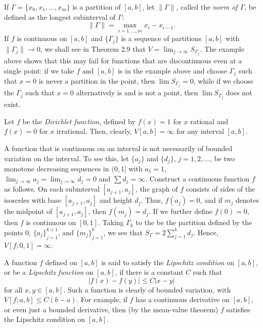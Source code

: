 If $\Gamma=\{x_0,x_1,\dotsc,x_m\}$ is a partition of $[a,b]$, let
$\|\Gamma\|$, called the \emph{norm of $\Gamma$}, be defined as the longest
subinterval of $\Gamma$:
\begin{equation}
\label{eq:eq:partition-norm}
\|\Gamma\|=\max_{i=1,\dotsc,m} x_i-x_{i-1}.
\end{equation}
If $f$ is continuous on $[a,b]$ and $\{\Gamma_j\}$ is a sequence of
partitions $[a,b]$ with $\|\Gamma_j\|\to 0$, we shall see in Theorem 2.9
that $V=\lim_{j\to\infty} S_{\Gamma_j}$. The example above shows that this
may fail for functions that are discontinuous even at a single point: if we
take $f$ and $[a,b]$ is in the example above and choose $\Gamma_j$ such
that $x=0$ is never a partition in the point, then $\lim S_{\Gamma_j}=0$,
while if we choose the $\Gamma_j$ such that $x=0$ alternatively is and is
not a point, then $\lim S_{\Gamma_j}$ does not exist.
\begin{example}
Let $f$ be the \emph{Dirichlet function}, defined by $f(x)= 1$ for
$x$ rational and $f(x)= 0$ for $x$ irrational. Then, clearly,
$V[a,b]=\infty$ for any interval $[a,b]$.
\end{example}
\begin{example}
A function that is continuous on an interval is not necessarily of bounded
variation on the interval. To see this, let $\{a_j\}$ and $\{d_j\}$,
$j=1,2,\dotsc$, be two monotone decreasing sequences in $(0,1]$ with
$a_1=1$, $\lim_{j\to\infty} a_j=\lim_{j\to\infty} d_j=0$ and $\sum
d_j=\infty$. Construct a continuous function $f$ as follows. On each
subinterval $[a_{j+1},a_j]$, the graph of $f$ consists of sides of the
isosceles with base $[a_{j+1},a_j]$ and height $d_j$. Thus, $f(a_j)=0$, and
if $m_j$ denotes the midpoint of $[a_{j+1},a_j]$, then $f(m_j)=d_j$. If we
further define $f(0)=0$, then $f$ is continuous on $[0,1]$. Taking
$\Gamma_k$ to the be the partition defined by the points $0$,
${\{a_j\}}_{j=1}^{k+1}$, and ${\{m_j\}}_{j=1}^k$, we see that
$S_\Gamma=2\sum_{j=1}^k d_j$. Hence, $V[f;0,1]=\infty$.
\end{example}
\begin{example}
A function $f$ defined on $[a,b]$ is said to satisfy the \emph{Lipschitz
  condition} on $[a,b]$, or be a \emph{Lipschitz function} on $[a,b]$, if
there is a constant $C$ such that
\[
|f(x)-f(y)|\leq C|x-y|
\]
for all $x,y\in[a,b]$. Such a function is clearly of bounded variation,
with $V[f;a,b]\leq C(b-a)$. For example, if $f$ has a continuous derivative
on $[a,b]$, or even just a bounded derivative, then (by the mean-value
theorem) $f$ satisfies the Lipschitz condition on $[a,b]$.
\end{example}
